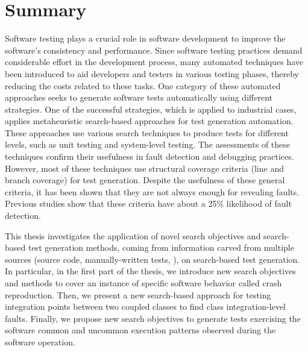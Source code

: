 \chapter*{Summary}

Software testing plays a crucial role in software development to improve the software's consistency and performance.
Since software testing practices demand considerable effort in the development process, many automated techniques have been introduced to aid developers and testers in various testing phases, thereby reducing the costs related to these tasks. One category of these automated approaches seeks to generate software tests automatically using different strategies. One of the successful strategies, which is applied to industrial cases, applies metaheuristic search-based approaches for test generation automation. These approaches use various search techniques to produce tests for different levels, such as unit testing and system-level testing. The assessments of these techniques confirm their usefulness in fault detection and debugging practices. However, most of these techniques use structural coverage criteria (\eg line and branch coverage) for test generation. Despite the usefulness of these general criteria, it has been shown that they are not always enough for revealing faults. Previous studies show that these criteria have about a 25\% likelihood of fault detection.


This thesis investigates the application of novel search objectives and search-based test generation methods, coming from information carved from multiple sources (\eg source code, manually-written tests, \etc), on search-based test generation. In particular, in the first part of the thesis, we introduce new search objectives and methods to cover an instance of specific software behavior called crash reproduction. Then, we present a new search-based approach for testing integration points between two coupled classes to find class integration-level faults. Finally, we propose new search objectives to generate tests exercising the software common and uncommon execution patterns observed during the software operation.

